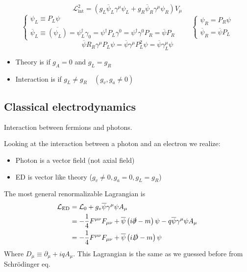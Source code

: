 \[ \mathcal{L} ^2_\text{int} = \left(g_L\overline{\psi}_L\gamma^\mu\psi_L + g_R\overline{\psi}_R\gamma^\mu\psi_R\right)V_\mu \]
\[\begin{cases}
\psi_L \equiv P_L\psi \\
\overline{\psi}_L \equiv \overline{(\psi_L)} = \psi_L^\dagger\gamma_0 = \psi^\dagger P_L \gamma^0 = \psi^\dagger\gamma^0 P_R = \overline{\psi}P_R
\end{cases} \qquad \begin{cases}
\psi_R = P_R\psi \\ \overline{\psi}_R = \overline{\psi}P_L
\end{cases}\]
\[ \overline{\psi}R_R\gamma^\mu P_L \psi = \overline{\psi}\gamma^\mu P_L^2\psi = \overline{\psi}\gamma^\mu_L\psi \]
\begin{itemize}
\item Theory is  if $g_A = 0$ and $g_L=g_R$
\item Interaction is  if $g_L \neq g_R \quad (g_v,g_a \neq 0)$
\end{itemize}

\subsection{Classical electrodynamics}
Interaction between fermions and photons.

Looking at the interaction between a photon and an electron we realize:
\begin{itemize}
\item Photon is a vector field (not axial field)
\item ED is vector like theory ($g_v \neq 0, g_a = 0, g_L = g_R$)
\end{itemize}
The most general renormalizable Lagrangian is
\begin{align*}
\mathcal{L} _\text{ED} &= \mathcal{L} _0 + g_v\overline{\psi}\gamma^\mu\psi A_\mu \\
&= - \frac{1}{4}F^{\mu\nu}F_{\mu\nu} + \overline{\psi} \left(i\slashed{\partial}-m\right)\psi - q\overline{\psi}\gamma^\mu\psi A_\mu \\
&= - \frac{1}{4}F^{\mu\nu}F_{\mu\nu} + \overline{\psi} \left(i\slashed{D}-m\right)\psi
\end{align*}
Where $D_\mu \equiv \partial_\mu+iqA_\mu$. This Lagrangian is the same as we guessed before from Schrödinger eq.

